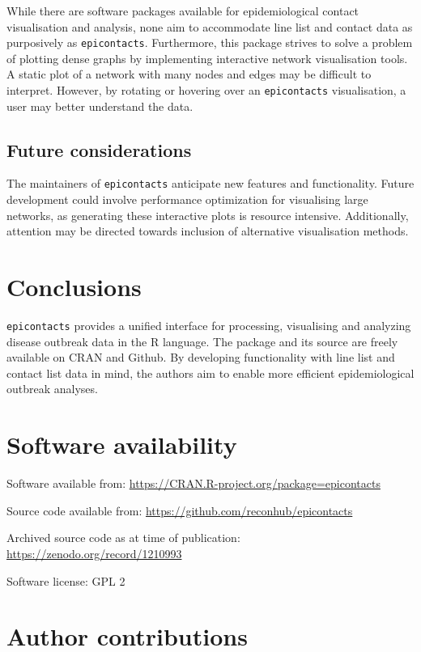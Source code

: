 \documentclass[9pt,a4paper,]{extarticle}
\theoremstyle{definition}
\theoremstyle{definition}
\theoremstyle{definition}
\theoremstyle{remark}
\begin{document}
While there are software packages available for epidemiological contact visualisation and analysis, none aim to accommodate line list and contact data as purposively as \texttt{epicontacts}\citep{noremark:2014}\citep{carroll:2014}\citep{guthrie:2017}. Furthermore, this package strives to solve a problem of plotting dense graphs by implementing interactive network visualisation tools. A static plot of a network with many nodes and edges may be difficult to interpret. However, by rotating or hovering over an \texttt{epicontacts} visualisation, a user may better understand the data.

\subsection{Future considerations}\label{future-considerations}

The maintainers of \texttt{epicontacts} anticipate new features and functionality. Future development could involve performance optimization for visualising large networks, as generating these interactive plots is resource intensive. Additionally, attention may be directed towards inclusion of alternative visualisation methods.

\section{Conclusions}\label{conclusions}

\texttt{epicontacts} provides a unified interface for processing, visualising and analyzing disease outbreak data in the R language. The package and its source are freely available on CRAN and Github. By developing functionality with line list and contact list data in mind, the authors aim to enable more efficient epidemiological outbreak analyses.

\section{Software availability}\label{software-availability}

Software available from: \url{https://CRAN.R-project.org/package=epicontacts}

Source code available from: \url{https://github.com/reconhub/epicontacts}

Archived source code as at time of publication: \url{https://zenodo.org/record/1210993}

Software license: GPL 2

\section{Author contributions}\label{author-contributions}
\end{document}
